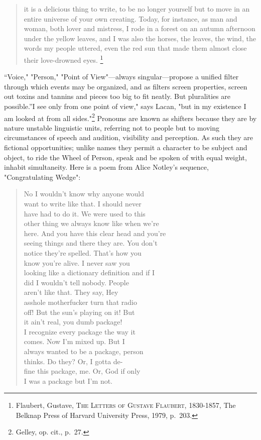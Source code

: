 \documentclass[
]{memoir}
\begin{document}
\begin{quote}
it is a delicious thing to write, to be no longer yourself but to move
in an entire universe of your own creating. Today, for instance, as man
and woman, both lover and mistress, I rode in a forest on an autumn
afternoon under the yellow leaves, and I was also the horses, the
leaves, the wind, the words my people uttered, even the red sun that
made them almost close their love-drowned eyes. \footnote{Flaubert,
  Gustave, \textsc{The Letters of Gustave Flaubert, 1830-1857}, The
  Belknap Press of Harvard University Press, 1979, p.~203.}
\end{quote}

``Voice," "Person," "Point of View"---always singular---propose a
unified filter through which events may be organized, and as filters
screen properties, screen out toxins and tannins and pieces too big to
fit neatly. But pluralities are possible.''I see only from one point of
view," says Lacan, "but in my existence I am looked at from all
sides."\footnote{Gelley, op. cit., p.~27.} Pronouns are known as
shifters because they are by nature unstable linguistic units, referring
not to people but to moving circumstances of speech and audition,
visibility and perception. As such they are fictional opportunities;
unlike names they permit a character to be subject and object, to ride
the Wheel of Person, speak and be spoken of with equal weight, inhabit
simultaneity. Here is a poem from Alice Notley's sequence,
"Congratulating Wedge":

\begin{verse}
No I wouldn’t know why anyone would\\
want to write like that. I should never\\
have had to do it. We were used to this\\
other thing we always know like when we’re\\
here. And you have this clear head and you’re\\
seeing things and there they are. You don’t\\
notice they’re spelled. That's how you\\
know you’re alive. I never saw you\\
looking like a dictionary definition and if I\\
did I wouldn’t tell nobody. People\\
aren’t like that. They say, Hey\\
asshole motherfucker turn that radio\\
off! But the sun’s playing on it! But\\
it ain’t real, you dumb package!\\
I recognize every package the way it\\
comes. Now I’m mixed up. But I\\
always wanted to be a package, person\\
thinks. Do they? Or, I gotta de-\\
fine this package, me. Or, God if only\\
I was a package but I’m not.\\
\end{verse}
\end{document}
